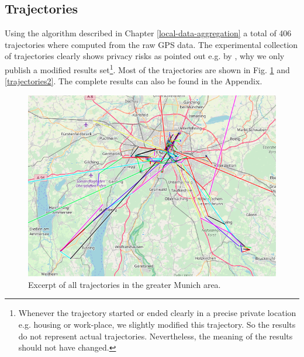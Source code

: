 \subsection{Trajectories}\label{trajectories}
Using the algorithm described in Chapter \ref{local-data-aggregation} a total of 406 trajectories where computed from the raw GPS data. The experimental collection of trajectories clearly shows privacy risks as pointed out e.g. by \parencite{cellphone}, why we only publish a modified results set\footnote{Whenever the trajectory started or ended clearly in a precise private location e.g. housing or work-place, we slightly modified this trajectory. So the results do not represent actual trajectories. Nevertheless, the meaning of the results should not have changed.}. Most of the trajectories are shown in Fig. \ref{trajectories1} and \ref{trajectories2}. The complete results can also be found in the Appendix.

\begin{figure}[h!]
	\includegraphics[width=\textwidth]{data/trajectories-2.png}
	\caption{Excerpt of all trajectories in the greater Munich area.}
	\label{trajectories1}
\end{figure}

